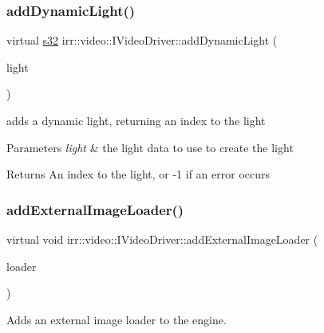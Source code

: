 \subsubsection{\texorpdfstring{add\+Dynamic\+Light()}{addDynamicLight()}}
{\footnotesize\ttfamily virtual \hyperlink{namespaceirr_ac66849b7a6ed16e30ebede579f9b47c6}{s32} irr\+::video\+::\+I\+Video\+Driver\+::add\+Dynamic\+Light (\begin{DoxyParamCaption}\item[{const \hyperlink{structirr_1_1video_1_1SLight}{S\+Light} \&}]{light }\end{DoxyParamCaption})\hspace{0.3cm}{\ttfamily [pure virtual]}}



adds a dynamic light, returning an index to the light 


\begin{DoxyParams}{Parameters}
{\em light} & the light data to use to create the light \\
\hline
\end{DoxyParams}
\begin{DoxyReturn}{Returns}
An index to the light, or -\/1 if an error occurs 
\end{DoxyReturn}
\mbox{\label{classirr_1_1video_1_1IVideoDriver_a9479ae15f0e26eaaf15c9420ff289b6d}} 
\subsubsection{\texorpdfstring{add\+External\+Image\+Loader()}{addExternalImageLoader()}}
{\footnotesize\ttfamily virtual void irr\+::video\+::\+I\+Video\+Driver\+::add\+External\+Image\+Loader (\begin{DoxyParamCaption}\item[{\hyperlink{classirr_1_1video_1_1IImageLoader}{I\+Image\+Loader} $\ast$}]{loader }\end{DoxyParamCaption})\hspace{0.3cm}{\ttfamily [pure virtual]}}



Adds an external image loader to the engine. 

